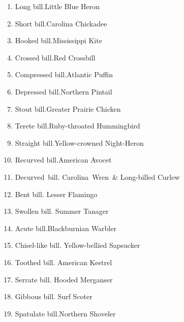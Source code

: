 \documentclass[11pt]{article}
\begin{document}
\thispagestyle{empty}

\setlength\columnsep{1.5cm}
\fontsize{18}{24}\selectfont 
\begin{multicols}{2}
\begin{enumerate}[itemsep=1cm]
\item Long bill.\newline Little Blue Heron
\item Short bill.\newline Carolina Chickadee
\item Hooked bill.\newline Mississippi Kite
\item Crossed bill.\newline Red Crossbill
\item Compressed bill.\newline Atlantic Puffin

\item Depressed bill.\newline Northern Pintail
\item Stout bill.\newline Greater Prairie Chicken
\item Terete bill.\newline Ruby-throated Hummingbird
\item Straight bill.\newline Yellow-crowned Night-Heron
\item Recurved bill.\newline American Avocet
\item Decurved~bill. Carolina~Wren~\& \newline Long-billed Curlew
\item Bent bill. \newline Lesser Flamingo

\item Swollen bill. \newline Summer Tanager
\item Acute bill.\newline  Blackburnian Warbler
\item Chisel-like bill. \newline Yellow-bellied Sapsucker
\item Toothed bill. \newline American Kestrel
\item Serrate bill. \newline Hooded Merganser
\item Gibbous bill. \newline Surf Scoter
\item Spatulate bill.\newline  Northern Shoveler


\end{enumerate}
\end{multicols}
\end{document}
